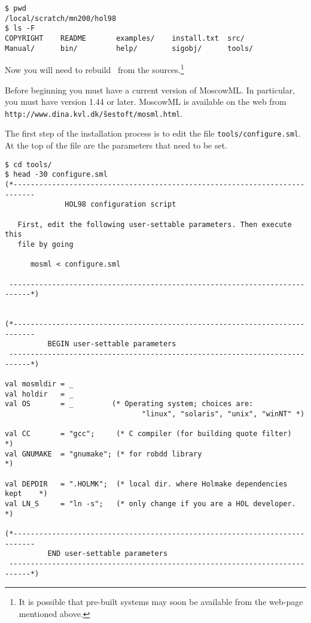 \setcounter{sessioncount}{1}
\begin{session}
\begin{verbatim}
$ pwd
/local/scratch/mn200/hol98
$ ls -F
COPYRIGHT    README       examples/    install.txt  src/
Manual/      bin/         help/        sigobj/      tools/
\end{verbatim}
\end{session}

Now you will need to rebuild \HOL\ from the sources.\footnote{It is
  possible that pre-built systems may soon be available from the
  web-page mentioned above.}

Before beginning you must have a current version of MoscowML.  In
particular, you must have version 1.44 or later.  MoscowML is
available on the web from \linebreak
\texttt{http://www.dina.kvl.dk/\~sestoft/mosml.html}.

The first step of the installation process is to edit the file
\texttt{tools/configure.sml}.  At the top of the file are the
parameters that need to be set.

\begin{session}
\begin{verbatim}
$ cd tools/
$ head -30 configure.sml
(*---------------------------------------------------------------------------
              HOL98 configuration script

   First, edit the following user-settable parameters. Then execute this
   file by going

      mosml < configure.sml

 ---------------------------------------------------------------------------*)


(*---------------------------------------------------------------------------
          BEGIN user-settable parameters
 ---------------------------------------------------------------------------*)

val mosmldir = _
val holdir   = _
val OS       = _         (* Operating system; choices are:
                                "linux", "solaris", "unix", "winNT" *)

val CC       = "gcc";     (* C compiler (for building quote filter)        *)
val GNUMAKE  = "gnumake"; (* for robdd library                             *)

val DEPDIR   = ".HOLMK";  (* local dir. where Holmake dependencies kept    *)
val LN_S     = "ln -s";   (* only change if you are a HOL developer.       *)

(*---------------------------------------------------------------------------
          END user-settable parameters
 ---------------------------------------------------------------------------*)
\end{verbatim}
\end{session}

